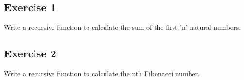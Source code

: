 \subsection{Exercise 1}
Write a recursive function to calculate the sum of the first 'n' natural numbers.


\subsection{Exercise 2}
Write a recursive function to calculate the nth Fibonacci number.


